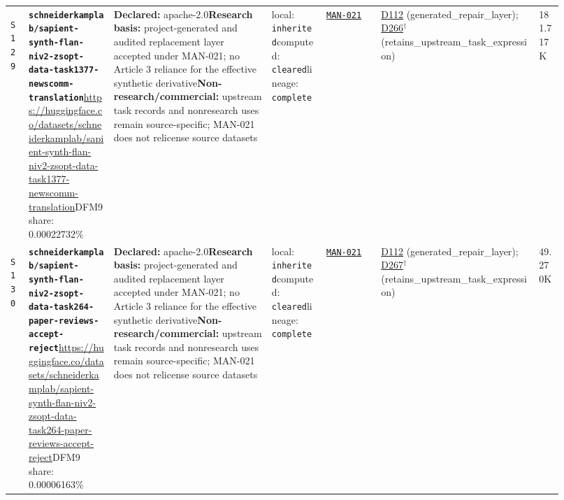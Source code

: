 \documentclass[9pt,a4paper]{article}
\newcommand{\srcid}[1]{\hypertarget{src:#1}{\texttt{#1}}}
\begin{document}
\begin{landscape}
\begin{longtable}{@{}L{0.03\linewidth}L{0.14\linewidth}L{0.26\linewidth}L{0.09\linewidth}L{0.09\linewidth}L{0.265\linewidth}L{0.045\linewidth}@{}}
\srcid{S129} & \textbf{\nolinkurl{schneiderkamplab/sapient-synth-flan-niv2-zsopt-data-task1377-newscomm-translation}}\newline \url{https://huggingface.co/datasets/schneiderkamplab/sapient-synth-flan-niv2-zsopt-data-task1377-newscomm-translation}\newline DFM9 share: 0.00022732\% & \textbf{Declared:} apache-2.0\newline \textbf{Research basis:} project-generated and audited replacement layer accepted under MAN-021; no Article 3 reliance for the effective synthetic derivative\newline \textbf{Non-research/commercial:} upstream task records and nonresearch uses remain source-specific; MAN-021 does not relicense source datasets & local: \texttt{inherited}\newline computed: \texttt{cleared}\newline lineage: \texttt{complete} & \hyperlink{manual:MAN-021}{\texttt{MAN-021}} & \hyperlink{dep:D112}{D112} (generated\_repair\_layer); \hyperlink{dep:D266}{D266}$^{\dagger}$ (retains\_upstream\_task\_expression) & 181.717K \\
\srcid{S130} & \textbf{\nolinkurl{schneiderkamplab/sapient-synth-flan-niv2-zsopt-data-task264-paper-reviews-accept-reject}}\newline \url{https://huggingface.co/datasets/schneiderkamplab/sapient-synth-flan-niv2-zsopt-data-task264-paper-reviews-accept-reject}\newline DFM9 share: 0.00006163\% & \textbf{Declared:} apache-2.0\newline \textbf{Research basis:} project-generated and audited replacement layer accepted under MAN-021; no Article 3 reliance for the effective synthetic derivative\newline \textbf{Non-research/commercial:} upstream task records and nonresearch uses remain source-specific; MAN-021 does not relicense source datasets & local: \texttt{inherited}\newline computed: \texttt{cleared}\newline lineage: \texttt{complete} & \hyperlink{manual:MAN-021}{\texttt{MAN-021}} & \hyperlink{dep:D112}{D112} (generated\_repair\_layer); \hyperlink{dep:D267}{D267}$^{\dagger}$ (retains\_upstream\_task\_expression) & 49.270K \\

\end{longtable}
\end{landscape}
\end{document}
